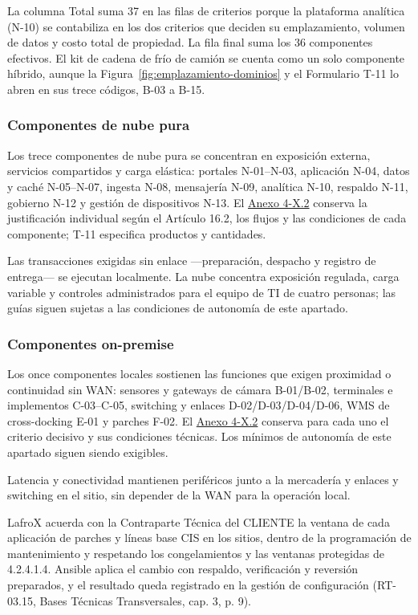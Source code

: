 La columna Total suma 37 en las filas de criterios porque la plataforma analítica (N-10) se contabiliza en los dos criterios que deciden su emplazamiento, volumen de datos y costo total de propiedad. La fila final suma los 36 componentes efectivos. El kit de cadena de frío de camión se cuenta como un solo componente híbrido, aunque la Figura~\ref{fig:emplazamiento-dominios} y el Formulario T-11 lo abren en sus trece códigos, B-03 a B-15.

\subsubsection{Componentes de nube pura}

Los trece componentes de nube pura se concentran en exposición externa, servicios compartidos y carga elástica: portales N-01--N-03, aplicación N-04, datos y caché N-05--N-07, ingesta N-08, mensajería N-09, analítica N-10, respaldo N-11, gobierno N-12 y gestión de dispositivos N-13. El \href{LAFROX-Subdocumento4-Anexos.pdf#anx:X-nube}{Anexo 4-X.2} conserva la justificación individual según el Artículo 16.2, los flujos y las condiciones de cada componente; T-11 especifica productos y cantidades.

Las transacciones exigidas sin enlace ---preparación, despacho y registro de entrega--- se ejecutan localmente. La nube concentra exposición regulada, carga variable y controles administrados para el equipo de TI de cuatro personas; las guías siguen sujetas a las condiciones de autonomía de este apartado.

\subsubsection{Componentes on-premise}

Los once componentes locales sostienen las funciones que exigen proximidad o continuidad sin WAN: sensores y gateways de cámara B-01/B-02, terminales e implementos C-03--C-05, switching y enlaces D-02/D-03/D-04/D-06, WMS de cross-docking E-01 y parches F-02. El \href{LAFROX-Subdocumento4-Anexos.pdf#anx:X-local}{Anexo 4-X.2} conserva para cada uno el criterio decisivo y sus condiciones técnicas. Los mínimos de autonomía de este apartado siguen siendo exigibles.

Latencia y conectividad mantienen periféricos junto a la mercadería y enlaces y switching en el sitio, sin depender de la WAN para la operación local.

LafroX acuerda con la Contraparte Técnica del CLIENTE la ventana de cada aplicación de parches y líneas base CIS en los sitios, dentro de la programación de mantenimiento y respetando los congelamientos y las ventanas protegidas de 4.2.4.1.4. Ansible aplica el cambio con respaldo, verificación y reversión preparados, y el resultado queda registrado en la gestión de configuración (RT-03.15, Bases Técnicas Transversales, cap. 3, p. 9).

